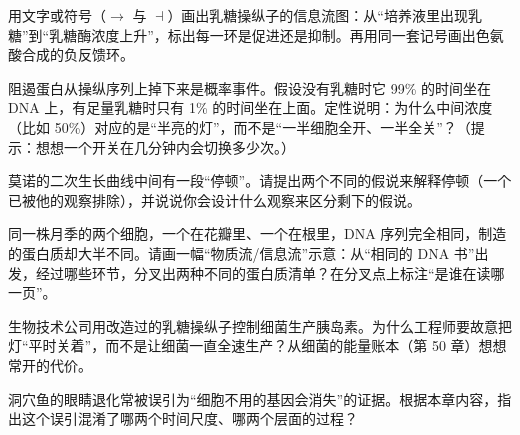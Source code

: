 \begin{sikaoti}
\item 用文字或符号（$\rightarrow$ 与 $\dashv$）画出乳糖操纵子的信息流图：从“培养液里出现乳糖”到“乳糖酶浓度上升”，标出每一环是促进还是抑制。再用同一套记号画出色氨酸合成的负反馈环。
\item 阻遏蛋白从操纵序列上掉下来是概率事件。假设没有乳糖时它 99\% 的时间坐在 DNA 上，有足量乳糖时只有 1\% 的时间坐在上面。定性说明：为什么中间浓度（比如 50\%）对应的是“半亮的灯”，而不是“一半细胞全开、一半全关”？（提示：想想一个开关在几分钟内会切换多少次。）
\item 莫诺的二次生长曲线中间有一段“停顿”。请提出两个不同的假说来解释停顿（一个已被他的观察排除），并说说你会设计什么观察来区分剩下的假说。
\item 同一株月季的两个细胞，一个在花瓣里、一个在根里，DNA 序列完全相同，制造的蛋白质却大半不同。请画一幅“物质流/信息流”示意：从“相同的 DNA 书”出发，经过哪些环节，分叉出两种不同的蛋白质清单？在分叉点上标注“是谁在读哪一页”。
\item 生物技术公司用改造过的乳糖操纵子控制细菌生产胰岛素。为什么工程师要故意把灯“平时关着”，而不是让细菌一直全速生产？从细菌的能量账本（第 50 章）想想常开的代价。
\item 洞穴鱼的眼睛退化常被误引为“细胞不用的基因会消失”的证据。根据本章内容，指出这个误引混淆了哪两个时间尺度、哪两个层面的过程？
\end{sikaoti}
